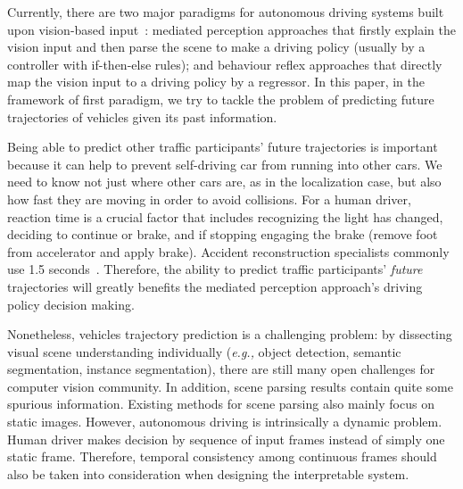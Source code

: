 \documentclass[10pt,twocolumn,letterpaper]{article}
\begin{document}

Currently, there are two major paradigms for autonomous driving systems built upon vision-based input~\cite{chen2015deepdriving}: mediated perception approaches that firstly explain the vision input and then parse the scene to make a driving policy (usually by a controller with if-then-else rules); and behaviour reflex approaches that directly map the vision input to a driving policy by a regressor.
In this paper, in the framework of first paradigm, we try to tackle the problem of predicting future trajectories of vehicles given its past information.


 Being able to predict other traffic participants' future trajectories is important because it can help to prevent self-driving car from running into other cars. We need to know not just where other cars are, as in the localization case, but also how fast they are moving in order to avoid collisions.
For a human driver, reaction time is a crucial factor that includes recognizing the light has changed, deciding to continue or brake, and if stopping engaging the brake (remove foot from accelerator and apply brake). Accident reconstruction specialists commonly use 1.5 seconds~\cite{mcgehee2000driver}.
Therefore, the ability to predict traffic participants' \emph{future} trajectories will greatly benefits the mediated perception approach's driving policy decision making.



Nonetheless, vehicles trajectory prediction is a challenging problem: by dissecting visual scene understanding individually (\emph{e.g.,} object detection, semantic segmentation, instance segmentation),  there are still many open challenges for computer vision community.
In addition, scene parsing results contain quite some spurious information.
Existing methods for scene parsing also mainly focus on static images.
However, autonomous driving is intrinsically a dynamic problem. Human driver makes decision by sequence of input frames instead of simply one static frame.
Therefore, temporal consistency among continuous frames should also be taken into consideration when designing the interpretable system.
\end{document}
